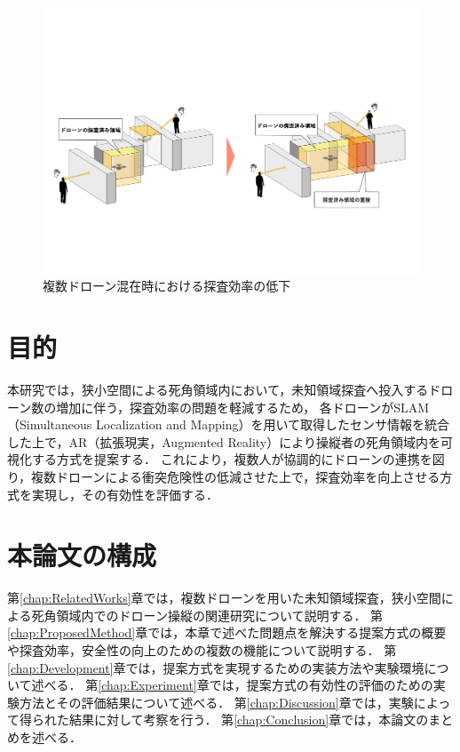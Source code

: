 \documentclass[a4paper,11pt]{ujreport}
\begin{document}
\begin{figure}[!tb]
  \centering
  \includegraphics[width=\linewidth]{img/01_efficient.pdf}
  \caption{複数ドローン混在時における探査効率の低下}
  \label{fig:01_efficient}
\end{figure}


\section{目的}
\label{sec:Purpose}

本研究では，狭小空間による死角領域内において，未知領域探査へ投入するドローン数の増加に伴う，探査効率の問題を軽減するため，
各ドローンがSLAM（Simultaneous Localization and Mapping）を用いて取得したセンサ情報を統合した上で，AR（拡張現実，Augmented Reality）により操縦者の死角領域内を可視化する方式を提案する．
これにより，複数人が協調的にドローンの連携を図り，複数ドローンによる衝突危険性の低減させた上で，探査効率を向上させる方式を実現し，その有効性を評価する．

\section{本論文の構成}

第\ref{chap:RelatedWorks}章では，複数ドローンを用いた未知領域探査，狭小空間による死角領域内でのドローン操縦の関連研究について説明する．
第\ref{chap:ProposedMethod}章では，本章で述べた問題点を解決する提案方式の概要や探査効率，安全性の向上のための複数の機能について説明する．
第\ref{chap:Development}章では，提案方式を実現するための実装方法や実験環境について述べる．
第\ref{chap:Experiment}章では，提案方式の有効性の評価のための実験方法とその評価結果について述べる．
第\ref{chap:Discussion}章では，実験によって得られた結果に対して考察を行う．
第\ref{chap:Conclusion}章では，本論文のまとめを述べる．\par
\end{document}

